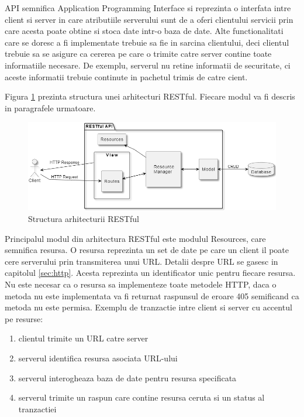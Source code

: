 API semnifica Application Programming Interface si reprezinta o interfata intre client si server in care atributiile serverului sunt de a oferi 
clientului servicii prin care acesta poate obtine si stoca date intr-o baza de date. Alte functionalitati care se doresc a fi implementate trebuie 
sa fie in sarcina clientului, deci clientul trebuie sa se asigure ca cererea pe care o trimite catre server contine toate informatiile necesare. 
De exemplu, serverul nu retine informatii de securitate, ci aceste informatii trebuie continute in pachetul trimis de catre cient.

Figura \ref{fig:RESTfulStructure} prezinta structura unei arhitecturi RESTful. Fiecare modul va fi descris in paragrafele urmatoare.
\begin{figure}[H]
    \centering
    \includegraphics[scale=0.7]{figs/RESTfulStructure.png}
    \caption{Structura arhitecturii RESTful}
    \label{fig:RESTfulStructure}
\end{figure}

Principalul modul din arhitectura RESTful este modulul Resources, care semnifica resursa. O resursa reprezinta un set de date pe care un client il poate 
cere serverului prin transmiterea unui URL. Detalii despre URL se gasesc in capitolul \ref{sec:http}. Acesta reprezinta un identificator unic pentru 
fiecare resursa. Nu este necesar ca o resursa sa implementeze toate metodele HTTP, daca o metoda nu este implementata va fi returnat raspunsul de eroare 
405 semificand ca metoda nu este permisa. Exemplu de tranzactie intre client si server cu accentul pe resurse:
\begin{enumerate}
	\item clientul trimite un URL catre server
	\item serverul identifica resursa asociata URL-ului
	\item serverul interogheaza baza de date pentru resursa specificata
	\item serverul trimite un raspun care contine resursa ceruta si un status al tranzactiei
\end{enumerate}

